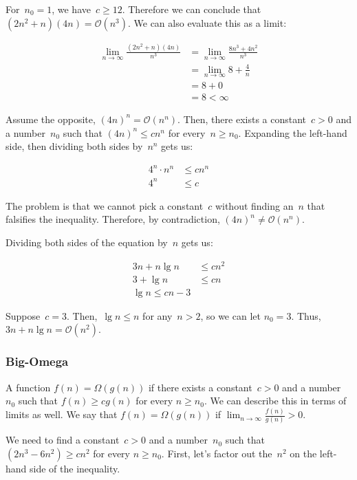 For~$n_0=1$, we have~$c\geq 12$. 
Therefore we can conclude that $(2n^2 + n)(4n) = \mathcal{O}(n^3)$. 
We can also evaluate this as a limit:

\begin{align*}
  \lim_{n \to \infty} \frac{(2n^2 + n)(4n)}{n^3} &= \lim_{n \to \infty} \frac{8n^3 + 4n^2}{n^3}\\
  &= \lim_{n \to \infty} 8 + \frac{4}{n}\\
  &= 8 + 0\\
  &= 8 < \infty
\end{align*}

Assume the opposite, $(4n)^n = \mathcal{O}(n^n)$. 
Then, there exists a constant~$c > 0$ and a number~$n_0$ such that $(4n)^n \leq cn^n$ for every~$n \geq n_0$. 
Expanding the left-hand side, then dividing both sides by~$n^n$ gets us:

\begin{align*}
  4^n \cdot n^n &\leq cn^n\\
  4^n &\leq c
\end{align*}

The problem is that we cannot pick a constant~$c$ without finding an~$n$ that falsifies the inequality. 
Therefore, by contradiction, $(4n)^n \neq \mathcal{O}(n^n)$.

Dividing both sides of the equation by~$n$ gets us:

\begin{align*}
  3n + n\lg{n} &\leq cn^2\\
  3 + \lg{n} &\leq cn\\
  \lg{n} \leq cn - 3
\end{align*}

Suppose~$c = 3$. 
Then,~$\lg{n} \leq n$ for any~$n > 2$, so we can let $n_0 = 3$. 
Thus, $3n + n\lg{n} = \mathcal{O}(n^2)$.

\subsubsection*{Big-Omega}
A function $f(n) = \Omega(g(n))$ if there exists a constant~$c > 0$ and a number~$n_0$ such that $f(n) \geq cg(n)$ for every $n \geq n_0$. 
We can describe this in terms of limits as well. 
We say that $f(n) = \Omega(g(n))$ if $\lim_{n \to \infty} \frac{f(n)}{g(n)} > 0$.

We need to find a constant~$c > 0$ and a number~$n_0$ such that $(2n^3 - 6n^2) \geq cn^2$ for every $n \geq n_0$. 
First, let's factor out the~$n^2$ on the left-hand side of the inequality.

